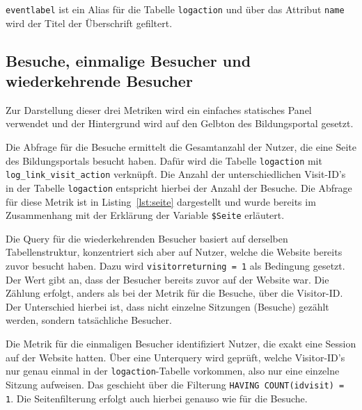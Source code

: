 \begin{figure}[H]
    \centering
    \begin{minipage}{\textwidth}
        
    \end{minipage}
\end{figure}

\texttt{event\textunderscore label} ist ein Alias für die Tabelle \texttt{log\textunderscore action} und über das Attribut \texttt{name} wird der Titel der Überschrift gefiltert.

\subsection{Besuche, einmalige Besucher und wiederkehrende Besucher}
Zur Darstellung dieser drei Metriken wird ein einfaches statisches Panel verwendet und der Hintergrund wird auf den Gelbton des Bildungsportal gesetzt.

Die Abfrage für die Besuche ermittelt die Gesamtanzahl der Nutzer, die eine Seite des Bildungsportals besucht haben. Dafür wird die Tabelle \texttt{log\textunderscore action} mit \texttt{log\allowbreak\_link\allowbreak\_visit\allowbreak\_action} verknüpft. Die Anzahl der unterschiedlichen Visit-ID's in der Tabelle \texttt{log\textunderscore action} entspricht hierbei der Anzahl der Besuche. Die Abfrage für diese Metrik ist in Listing~\ref{lst:seite} dargestellt und wurde bereits im Zusammenhang mit der Erklärung der Variable \texttt{\$Seite} erläutert.

Die Query für die wiederkehrenden Besucher basiert auf derselben Tabellenstruktur, konzentriert sich aber auf Nutzer, welche die Website bereits zuvor besucht haben. Dazu wird \texttt{visitor\textunderscore returning = 1} als Bedingung gesetzt. Der Wert \grqq{} gibt an, dass der Besucher bereits zuvor auf der Website war. Die Zählung erfolgt, anders als bei der Metrik für die Besuche, über die Visitor-ID. Der Unterschied hierbei ist, dass nicht einzelne Sitzungen (Besuche) gezählt werden, sondern tatsächliche Besucher.

Die Metrik für die einmaligen Besucher identifiziert Nutzer, die exakt eine Session auf der Website hatten. Über eine Unterquery wird geprüft, welche Visitor-ID's nur genau einmal in der \texttt{log\textunderscore action}-Tabelle vorkommen, also nur eine einzelne Sitzung aufweisen. Das geschieht über die Filterung \texttt{HAVING COUNT(idvisit) = 1}. Die Seitenfilterung erfolgt auch hierbei genauso wie für die Besuche.

